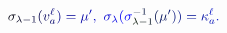 \documentclass[12pt]{article}
\begin{document}
\makeatletter
\renewcommand*{\@textcolor}[3]{%
  \protect\leavevmode
  \begingroup
    \color#1{#2}#3%
  \endgroup
}
\makeatother
\begin{displaymath}
\mathcolor[RGB]{0,0,15}{\sigma} _ { \mathcolor[RGB]{0,0,30}{\lambda} \mathcolor[RGB]{0,0,45}{-} \mathcolor[RGB]{0,0,60}{1} } \mathcolor[RGB]{0,0,75}{(} \mathcolor[RGB]{0,0,90}{v} _ { \mathcolor[RGB]{0,0,105}{a} } ^ { \mathcolor[RGB]{0,0,120}{\ell} } \mathcolor[RGB]{0,0,135}{)} \mathcolor[RGB]{0,0,150}{=} \mathcolor[RGB]{0,0,165}{\mu} ^ { \mathcolor[RGB]{0,0,180}{\prime} } \mathcolor[RGB]{0,0,195}{,} \ \mathcolor[RGB]{0,0,210}{\sigma} _ { \mathcolor[RGB]{0,0,225}{\lambda} } \mathcolor[RGB]{0,0,240}{(} \mathcolor[RGB]{0,0,255}{\sigma} _ { \mathcolor[RGB]{0,15,0}{\lambda} \mathcolor[RGB]{0,15,15}{-} \mathcolor[RGB]{0,15,30}{1} } ^ { \mathcolor[RGB]{0,15,45}{-} \mathcolor[RGB]{0,15,60}{1} } \mathcolor[RGB]{0,15,75}{(} \mathcolor[RGB]{0,15,90}{\mu} ^ { \mathcolor[RGB]{0,15,105}{\prime} } \mathcolor[RGB]{0,15,120}{)} \mathcolor[RGB]{0,15,135}{)} \mathcolor[RGB]{0,15,150}{=} \mathcolor[RGB]{0,15,165}{\kappa} _ { \mathcolor[RGB]{0,15,180}{a} } ^ { \mathcolor[RGB]{0,15,195}{\ell} } \mathcolor[RGB]{0,15,210}{.}
\end{displaymath}
\end{document}
